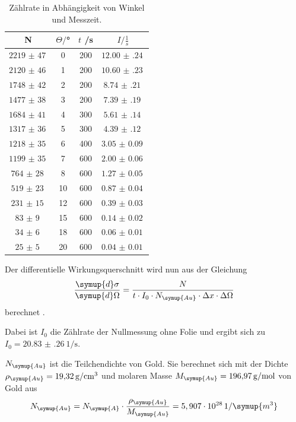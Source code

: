 \begin{table}[H]
  \centering
  \caption{Zählrate in Abhängigkeit von Winkel und Messzeit.}
  \label{tab:Parameter}
  \begin{tabular}{c c c c}
    \toprule
    N & $\Theta/$° & $t$ /s & $I / \frac{1}{s}$\\
    \midrule
    $\SI{2219(47)}{}$ &  0 & 200 & $\SI{12.00(24)}{}$ \\
    $\SI{2120(46)}{}$ &  1 & 200 & $\SI{10.60(23)}{}$ \\
    $\SI{1748(42)}{}$ &  2 & 200 & $\SI{8.74(21)}{}$ \\
    $\SI{1477(38)}{}$ &  3 & 200 & $\SI{7.39(19)}{}$ \\
    $\SI{1684(41)}{}$ &  4 & 300 & $\SI{5.61(14)}{}$ \\
    $\SI{1317(36)}{}$ &  5 & 300 & $\SI{4.39(12)}{}$ \\
    $\SI{1218(35)}{}$ &  6 & 400 & $\SI{3.05(9)}{}$ \\
    $\SI{1199(35)}{}$ &  7 & 600 & $\SI{2.00(6)}{}$ \\
    $\SI{764(28)}{}$  &  8 & 600 & $\SI{1.27(5)}{}$ \\
    $\SI{519(23)}{}$  & 10 & 600 & $\SI{0.87(4)}{}$ \\
    $\SI{231(15)}{}$  & 12 & 600 & $\SI{0.39(3)}{}$ \\
    $\SI{83(9)}{}$    & 15 & 600 & $\SI{0.14(2)}{}$ \\
    $\SI{34(6)}{}$    & 18 & 600 & $\SI{0.06(1)}{}$ \\
    $\SI{25(5)}{}$    & 20 & 600 & $\SI{0.04(1)}{}$ \\
    \bottomrule
  \end{tabular}
\end{table}

Der differentielle Wirkungsquerschnitt wird nun aus der Gleichung
\begin{equation}
  \frac{\symup{d}\sigma}{\symup{d}\Omega} = \frac{N}{t \cdot I_0 \cdot N_\symup{Au} \cdot \Delta x \cdot \Delta \Omega}
  \label{eqn:wq}
\end{equation}
berechnet \cite{sample10} \cite{sample9}.

Dabei ist $I_0$ die Zählrate der Nullmessung ohne Folie und ergibt sich zu $I_0 =\SI{20.83(26)}{1\per\second}$.

$N_\symup{Au}$ ist die Teilchendichte von Gold. Sie berechnet sich mit der Dichte
$\rho_\symup{Au} = \SI{19.32}{\gram\per\centi\meter^3}$ \cite{sample} und molaren Masse $M_\symup{Au} = \SI{196.97}{\gram\per\mol}$ \cite{sample}
von Gold aus
\begin{equation}
  N_\symup{Au} = N_\symup{A} \cdot \frac{\rho_\symup{Au}}{M_\symup{Au}} = 5,907 \cdot 10^{28} \, 1/\symup{m^3}
  \label{eqn:teilchendichte}
\end{equation}


